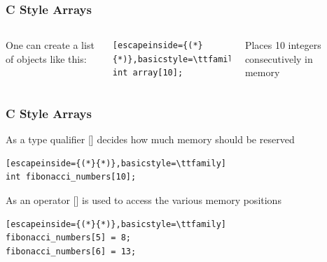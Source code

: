 \documentclass[14pt,a4paper,dvipsnames,usenames]{beamer}
\begin{document}
\begin{frame}[fragile]
  \frametitle{{\LARGE C} \hspace{.2em} Style Arrays}

  \begin{columns}
      One can create a list of objects like this:
    
      \vspace{1em}
    
      \begin{lstlisting}[escapeinside={(*}{*)},basicstyle=\ttfamily]
int array[10];
      \end{lstlisting}
    
      \vspace{1em}
    
      Places 10 integers consecutively in memory

    \vspace*{-1.5cm}
    \begin{center}
    \end{center}
    \end{columns}
\end{frame}

\begin{frame}[fragile]
  \frametitle{{\LARGE C} \hspace{.2em} Style Arrays}

  As a type qualifier {\large\color{Tropiteal} []} decides how much memory should be reserved

  \begin{lstlisting}[escapeinside={(*}{*)},basicstyle=\ttfamily]
int fibonacci_numbers[10];
  \end{lstlisting}

  \vspace{1em}

  As an operator {\large\color{Tropiteal} []} is used to access the various memory positions

  \begin{lstlisting}[escapeinside={(*}{*)},basicstyle=\ttfamily]
fibonacci_numbers[5] = 8;
fibonacci_numbers[6] = 13;
  \end{lstlisting}

\end{frame}
\end{document}
